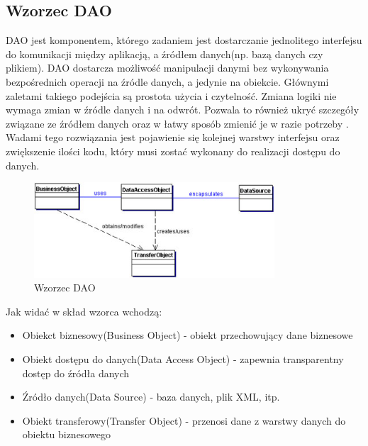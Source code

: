 \documentclass[12pt]{report}
\begin{document}
\subsection{Wzorzec DAO}
	\indent DAO jest komponentem, którego zadaniem jest dostarczanie jednolitego interfejsu do komunikacji między aplikacją, a źródłem danych(np. bazą danych czy plikiem). DAO dostarcza możliwość manipulacji danymi bez wykonywania bezpośrednich operacji na źródle danych, a jedynie na obiekcie. Głównymi zaletami takiego podejścia są prostota użycia i czytelność. Zmiana logiki nie wymaga zmian w źródle danych i na odwrót. Pozwala to również ukryć szczegóły związane ze źródłem danych oraz w łatwy sposób zmienić je w razie potrzeby \cite{dao}. \\
	\indent Wadami tego rozwiązania jest pojawienie się kolejnej warstwy interfejsu oraz zwiększenie ilości kodu, który musi zostać wykonany do realizacji dostępu do danych.
\begin{figure}[h]
	\centering
	\includegraphics[width=0.8\textwidth]{images/dao.jpg}
	\caption{Wzorzec DAO \cite{daoimg}}
\end{figure}
\FloatBarrier
Jak widać w skład wzorca wchodzą:
\begin{itemize}
\item{Obiekct biznesowy(Business Object) - obiekt przechowujący dane biznesowe}
\item{Obiekt dostępu do danych(Data Access Object) - zapewnia transparentny dostęp do źródła danych}
\item{Źródło danych(Data Source) - baza danych, plik XML, itp.}
\item{Obiekt transferowy(Transfer Object) - przenosi dane z warstwy danych do obiektu biznesowego}
\end{itemize}
\end{document}
